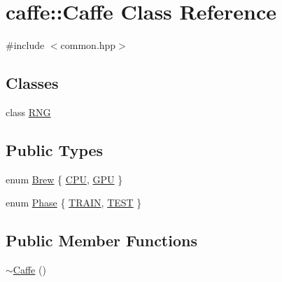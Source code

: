 \hypertarget{classcaffe_1_1_caffe}{\section{caffe\+:\+:Caffe Class Reference}
\label{classcaffe_1_1_caffe}
}


{\ttfamily \#include $<$common.\+hpp$>$}

\subsection*{Classes}
\begin{DoxyCompactItemize}
\item 
class \hyperlink{classcaffe_1_1_caffe_1_1_r_n_g}{R\+N\+G}
\end{DoxyCompactItemize}
\subsection*{Public Types}
\begin{DoxyCompactItemize}
\item 
enum \hyperlink{classcaffe_1_1_caffe_af8f607248c1f212be1f6f1c988d80e4e}{Brew} \{ \hyperlink{classcaffe_1_1_caffe_af8f607248c1f212be1f6f1c988d80e4ea63f3aab774a57c836a8ec3b306caa150}{C\+P\+U}, 
\hyperlink{classcaffe_1_1_caffe_af8f607248c1f212be1f6f1c988d80e4ea1c6fc57b019c260dbb06627208cbaeb8}{G\+P\+U}
 \}
\item 
enum \hyperlink{classcaffe_1_1_caffe_ad2993dccc4a615c39259ed7f0d0e24e9}{Phase} \{ \hyperlink{classcaffe_1_1_caffe_ad2993dccc4a615c39259ed7f0d0e24e9a52f1a7dbb49529ada6072caad00a0e5f}{T\+R\+A\+I\+N}, 
\hyperlink{classcaffe_1_1_caffe_ad2993dccc4a615c39259ed7f0d0e24e9acebef56fe5fe2d711e43fe18e779e116}{T\+E\+S\+T}
 \}
\end{DoxyCompactItemize}
\subsection*{Public Member Functions}
\begin{DoxyCompactItemize}
\item 
\hyperlink{classcaffe_1_1_caffe_a5b6a1c6daa535212b43ee7ad23942963}{$\sim$\+Caffe} ()
\end{DoxyCompactItemize}

